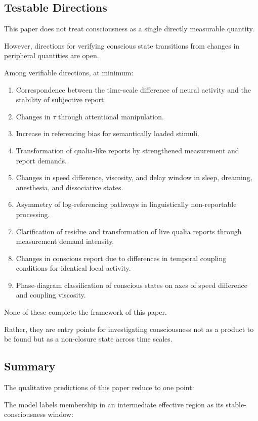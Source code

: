\subsection{Testable Directions}


This paper does not treat consciousness as a single directly measurable quantity.

However, directions for verifying conscious state transitions from changes in peripheral quantities are open.

Among verifiable directions, at minimum:

\begin{enumerate}
\item Correspondence between the time-scale difference of neural activity and the stability of subjective report.
\item Changes in $\tau$ through attentional manipulation.
\item Increase in referencing bias for semantically loaded stimuli.
\item Transformation of qualia-like reports by strengthened measurement and report demands.
\item Changes in speed difference, viscosity, and delay window in sleep, dreaming, anesthesia, and dissociative states.
\item Asymmetry of log-referencing pathways in linguistically non-reportable processing.
\item Clarification of residue and transformation of live qualia reports through measurement demand intensity.
\item Changes in conscious report due to differences in temporal coupling conditions for identical local activity.
\item Phase-diagram classification of conscious states on axes of speed difference and coupling viscosity.
\end{enumerate}

None of these complete the framework of this paper.

Rather, they are entry points for investigating consciousness not as a product to be found but as a non-closure state across time scales.

\subsection{Summary}


The qualitative predictions of this paper reduce to one point:

The model labels membership in an intermediate effective region as its stable-consciousness window:

